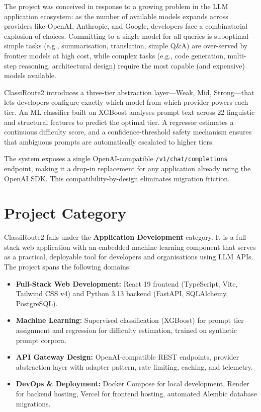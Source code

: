 \documentclass[12pt,a4paper]{report}
\begin{document}
The project was conceived in response to a growing problem in the LLM application ecosystem: as the number of available models expands across providers like OpenAI, Anthropic, and Google, developers face a combinatorial explosion of choices. Committing to a single model for all queries is suboptimal---simple tasks (e.g., summarisation, translation, simple Q\&A) are over-served by frontier models at high cost, while complex tasks (e.g., code generation, multi-step reasoning, architectural design) require the most capable (and expensive) models available.

ClassiRoute2 introduces a three-tier abstraction layer---Weak, Mid, Strong---that lets developers configure exactly which model from which provider powers each tier. An ML classifier built on XGBoost \cite{chen2016xgboost} analyses prompt text across 22 linguistic and structural features to predict the optimal tier. A regressor estimates a continuous difficulty score, and a confidence-threshold safety mechanism ensures that ambiguous prompts are automatically escalated to higher tiers.

The system exposes a single OpenAI-compatible \texttt{/v1/chat/completions} endpoint, making it a drop-in replacement for any application already using the OpenAI SDK. This compatibility-by-design eliminates migration friction.

\section{Project Category}

ClassiRoute2 falls under the \textbf{Application Development} category. It is a full-stack web application with an embedded machine learning component that serves as a practical, deployable tool for developers and organisations using LLM APIs. The project spans the following domains:

\begin{itemize}[nosep]
    \item \textbf{Full-Stack Web Development:} React 19 frontend (TypeScript, Vite, Tailwind CSS v4) and Python 3.13 backend (FastAPI, SQLAlchemy, PostgreSQL).
    \item \textbf{Machine Learning:} Supervised classification (XGBoost) for prompt tier assignment and regression for difficulty estimation, trained on synthetic prompt corpora.
    \item \textbf{API Gateway Design:} OpenAI-compatible REST endpoints, provider abstraction layer with adapter pattern, rate limiting, caching, and telemetry.
    \item \textbf{DevOps \& Deployment:} Docker Compose for local development, Render for backend hosting, Vercel for frontend hosting, automated Alembic database migrations.
\end{itemize}
\end{document}
